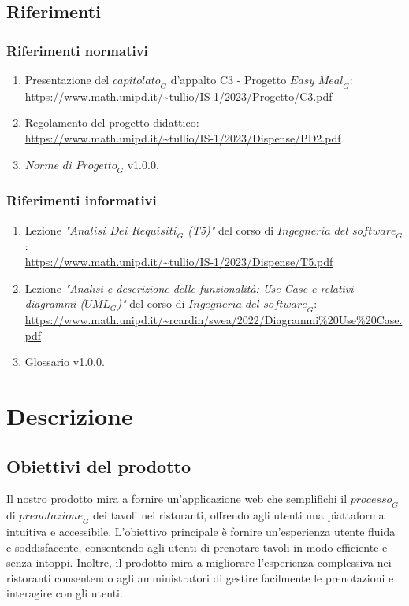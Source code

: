 \documentclass[12pt, oneside]{article}
\begin{document}
\subsection{Riferimenti}
\subsubsection{Riferimenti normativi}
\begin{enumerate}
    \item Presentazione del $\textit{capitolato}_G$ d'appalto C3 - Progetto $\textit{Easy Meal}_G$: \\ \url{https://www.math.unipd.it/~tullio/IS-1/2023/Progetto/C3.pdf}
    \item Regolamento del progetto didattico: \\ \url{https://www.math.unipd.it/~tullio/IS-1/2023/Dispense/PD2.pdf}
    \item $\textit{Norme di Progetto}_G$ v1.0.0.
\end{enumerate}
\subsubsection{Riferimenti informativi}
\begin{enumerate}
    \item Lezione \emph{"$\textit{Analisi Dei Requisiti}_G$ (T5)"} del corso di $\textit{Ingegneria del software}_G$: \\ \url{https://www.math.unipd.it/~tullio/IS-1/2023/Dispense/T5.pdf}
    \item Lezione \emph{"Analisi e descrizione delle funzionalità: Use Case e relativi diagrammi ($\textit{UML}_G$)"} del corso di $\textit{Ingegneria del software}_G$: \\ \url{https://www.math.unipd.it/~rcardin/swea/2022/Diagrammi%20Use%20Case.pdf}
    \item Glossario v1.0.0.
\end{enumerate}
\newpage

\section{Descrizione}
\subsection{Obiettivi del prodotto}
Il nostro prodotto mira a fornire un'applicazione web che semplifichi il $\textit{processo}_G$ di $\textit{prenotazione}_G$ dei tavoli nei ristoranti, offrendo agli utenti una piattaforma intuitiva e accessibile. L'obiettivo principale è fornire un'esperienza utente fluida e soddisfacente, consentendo agli utenti di prenotare tavoli in modo efficiente e senza intoppi. Inoltre, il prodotto mira a migliorare l'esperienza complessiva nei ristoranti consentendo agli amministratori di gestire facilmente le prenotazioni e interagire con gli utenti.
\end{document}
